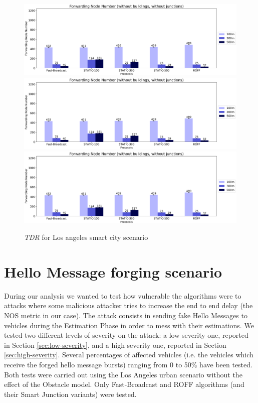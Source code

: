 	\begin{figure}[H]
		\centering
		\includegraphics[width=1.0\textwidth]{immagini/la-smart-city/b0/fnn}
		\includegraphics[width=1.0\textwidth]{immagini/la-smart-city/b1/h0/fnn}
		\includegraphics[width=1.0\textwidth]{immagini/la-smart-city/b1//h1/fnn}
		\caption{\textit{TDR} for Los angeles smart city scenario}
		\label{fig:la-smart-city-fnn}
	\end{figure}

	\section{Hello Message forging scenario}
		During our analysis we wanted to test how vulnerable the algorithms were to attacks where some malicious attacker tries to increase the end to end delay (the NOS metric in our case). The attack consists in sending fake Hello Messages to vehicles during the Estimation Phase in order to mess with their estimations. We tested two different levels of severity on the attack: a low severity one, reported in Section \ref{sec:low-severity}, and a high severity one, reported in Section \ref{sec:high-severity}. Several percentages of affected vehicles (i.e. the vehicles which receive the forged hello message bursts) ranging from 0 to 50\% have been tested. Both tests were carried out using the Los Angeles urban scenario without the effect of the Obstacle model. Only Fast-Broadcast and ROFF algorithms (and their Smart Junction variants) were tested.
		
